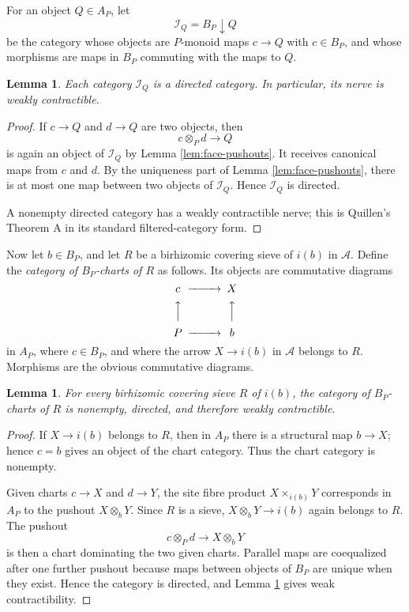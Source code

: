 \documentclass{article}
\newtheorem{lemma}[theorem]{Lemma}
\theoremstyle{definition}
\theoremstyle{remark}
\begin{document}
For an object \(Q\in A_P\), let
\[
\mathcal I_Q=B_P\!\downarrow\! Q
\]
be the category whose objects are \(P\)-monoid maps \(c\to Q\) with \(c\in B_P\), and whose morphisms are maps in \(B_P\) commuting with the maps to \(Q\).

\begin{lemma}\label{lem:directed-charts}
Each category \(\mathcal I_Q\) is a directed category.  In particular, its nerve is weakly contractible.
\end{lemma}

\begin{proof}
If \(c\to Q\) and \(d\to Q\) are two objects, then
\[
c\otimes_P d\longrightarrow Q
\]
is again an object of \(\mathcal I_Q\) by Lemma \ref{lem:face-pushouts}.  It receives canonical maps from \(c\) and \(d\).  By the uniqueness part of Lemma \ref{lem:face-pushouts}, there is at most one map between two objects of \(\mathcal I_Q\).  Hence \(\mathcal I_Q\) is directed.

A nonempty directed category has a weakly contractible nerve; this is Quillen's Theorem A in its standard filtered-category form.
\end{proof}

Now let \(b\in B_P\), and let \(R\) be a birhizomic covering sieve of \(i(b)\) in \(\mathcal A\).  Define the \emph{category of \(B_P\)-charts of \(R\)} as follows.  Its objects are commutative diagrams
\[
\begin{CD}
c @>>> X\\
@AAA @AAA\\
P @>>> b
\end{CD}
\]
in \(A_P\), where \(c\in B_P\), and where the arrow \(X\to i(b)\) in \(\mathcal A\) belongs to \(R\).  Morphisms are the obvious commutative diagrams.

\begin{lemma}\label{lem:chart-category-contractible}
For every birhizomic covering sieve \(R\) of \(i(b)\), the category of \(B_P\)-charts of \(R\) is nonempty, directed, and therefore weakly contractible.
\end{lemma}

\begin{proof}
If \(X\to i(b)\) belongs to \(R\), then in \(A_P\) there is a structural map \(b\to X\); hence \(c=b\) gives an object of the chart category.  Thus the chart category is nonempty.

Given charts \(c\to X\) and \(d\to Y\), the site fibre product \(X\times_{i(b)}Y\) corresponds in \(A_P\) to the pushout \(X\otimes_bY\).  Since \(R\) is a sieve, \(X\otimes_bY\to i(b)\) again belongs to \(R\).  The pushout
\[
c\otimes_P d\longrightarrow X\otimes_bY
\]
is then a chart dominating the two given charts.  Parallel maps are coequalized after one further pushout because maps between objects of \(B_P\) are unique when they exist.  Hence the category is directed, and Lemma \ref{lem:directed-charts} gives weak contractibility.
\end{proof}
\end{document}
